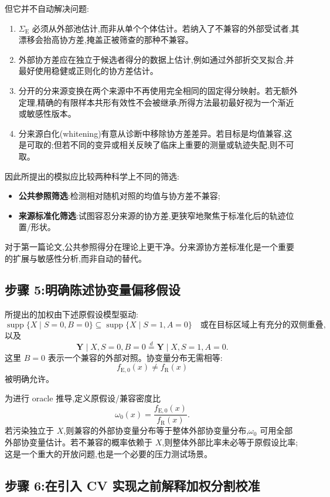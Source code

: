 \documentclass[11pt]{article}
\newcommand{\R}{\mathrm{R}}
\newcommand{\E}{\mathrm{E}}
\newcommand{\supp}{\operatorname{supp}}
\begin{document}
但它并不自动解决问题:
\begin{enumerate}
    \item $\Sigma_{\E}$ 必须从外部池估计,而非从单个个体估计。若纳入了不兼容的外部受试者,其漂移会抬高协方差,掩盖正被筛查的那种不兼容。
    \item 外部协方差应在独立于候选者得分的数据上估计,例如通过外部折交叉拟合,并最好使用稳健或正则化的协方差估计。
    \item 分开的分来源变换在两个来源中不再使用完全相同的固定得分映射。若无额外定理,精确的有限样本共形有效性不会被继承;所得方法最初最好视为一个渐近或敏感性版本。
    \item 分来源白化(whitening)有意从诊断中移除协方差差异。若目标是均值兼容,这是可取的;但若不同的变异或相关反映了临床上重要的测量或轨迹失配,则不可取。
\end{enumerate}

因此所提出的模拟应比较两种科学上不同的筛选:
\begin{itemize}
    \item \textbf{公共参照筛选}:检测相对随机对照的均值与协方差不兼容;
    \item \textbf{来源标准化筛选}:试图容忍分来源的协方差,更狭窄地聚焦于标准化后的轨迹位置/形状。
\end{itemize}

对于第一篇论文,公共参照得分在理论上更干净。分来源协方差标准化是一个重要的扩展与敏感性分析,而非自动的替代。

\subsection{步骤 5:明确陈述协变量偏移假设}

所提出的加权由下述原假设模型驱动:
\[
\supp\{X\mid S=0,B=0\}\subseteq \supp\{X\mid S=1,A=0\}
\quad\text{或在目标区域上有充分的双侧重叠},
\tag{8}
\]
以及
\[
\bm Y\mid X,S=0,B=0
\overset d=
\bm Y\mid X,S=1,A=0.
\tag{9}
\]
这里 $B=0$ 表示一个兼容的外部对照。协变量分布无需相等:
\[
f_{\E,0}(x)\neq f_{\R}(x)
\]
被明确允许。

为进行 oracle 推导,定义原假设/兼容密度比
\[
\omega_0(x)=\frac{f_{\E,0}(x)}{f_{\R}(x)}.
\tag{10}
\]
若污染独立于 $X$,则兼容的外部协变量分布等于整体外部协变量分布,$\omega_0$ 可用全部外部协变量估计。若不兼容的概率依赖于 $X$,则整体外部比率未必等于原假设比率;这是一个重大的开放问题,也是一个必要的压力测试场景。

\subsection{步骤 6:在引入 CV 实现之前解释加权分割校准}
\end{document}
